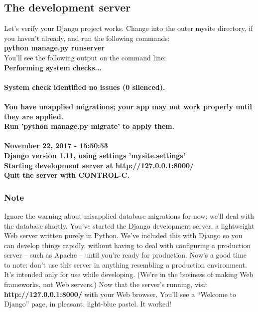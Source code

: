 \documentclass[11pt]{article}
\begin{document}
\begin{multicols}{2}
\subsection{The development server}
Let’s verify your Django project works. Change into the outer mysite directory, if you haven't already, and run the following commands:
\\	\textbf{python manage.py runserver}
\\You'll see the following output on the command line:
\\	\textbf{Performing system checks...}
\\
\\	\textbf{System check identified no issues (0 silenced).}
\\
\\	\textbf{You have unapplied migrations; your app may not work properly until they are applied.}
\\	\textbf{Run 'python manage.py migrate' to apply them.}
\\
\\	\textbf{November 22, 2017 - 15:50:53}
\\	\textbf{Django version 1.11, using settings 'mysite.settings'}
\\	\textbf{Starting development server at http://127.0.0.1:8000/}
\\	\textbf{Quit the server with CONTROL-C.}
\subsubsection{Note}
Ignore the warning about misapplied database migrations for now; we'll deal with the database shortly.
You've started the Django development server, a lightweight Web server written purely in Python. We've included this with Django so you can develop things rapidly, without having to deal with configuring a production server – such as Apache – until you're ready for production.
Now's a good time to note: don't use this server in anything resembling a production environment. It's intended only for use while developing. (We're in the business of making Web frameworks, not Web servers.)
Now that the server's running, visit \textbf{http://127.0.0.1:8000/} with your Web browser. You'll see a “Welcome to Django” page, in pleasant, light-blue pastel. It worked!

\end{multicols}
\end{document}
